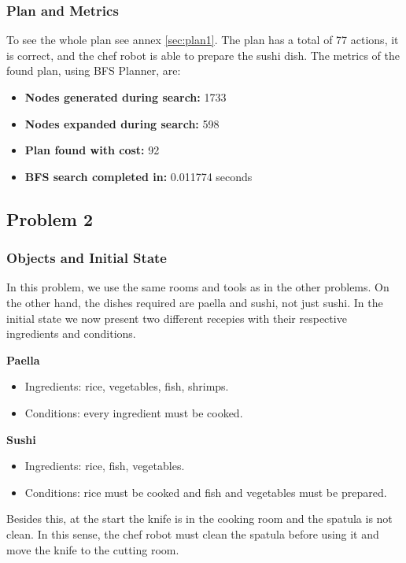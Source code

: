 \documentclass[a4paper,12pt]{article}
\begin{document}
\subsubsection{Plan and Metrics}
To see the whole plan see annex \ref{sec:plan1}. The plan has a total of 77 actions, it is correct, and the chef robot is able to prepare the sushi dish. The metrics of the found plan, using BFS Planner, are:

\begin{itemize}
    \item \textbf{Nodes generated during search:} 1733
    \item \textbf{Nodes expanded during search:} 598
    \item \textbf{Plan found with cost:} 92
    \item \textbf{BFS search completed in:} 0.011774 seconds
\end{itemize}



\subsection{Problem 2}
\subsubsection{Objects and Initial State}
In this problem, we use the same rooms and tools as in the other problems. On the other hand, the dishes required are paella and sushi, not just sushi. In the initial state we now present two different recepies with their respective ingredients and conditions.

 \textbf{Paella}
\begin{itemize}
    \item Ingredients: rice, vegetables, fish, shrimps.
    \item Conditions: every ingredient must be cooked.
\end{itemize}

\textbf{Sushi}
\begin{itemize}
    \item Ingredients: rice, fish, vegetables.
    \item Conditions: rice must be cooked and fish and vegetables must be prepared.
\end{itemize}

Besides this, at the start the knife is in the cooking room and the spatula is not clean. In this sense, the chef robot must clean the spatula before using it and move the knife to the cutting room.
\end{document}
